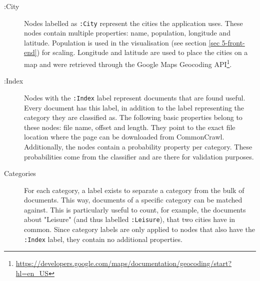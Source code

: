 \begin{description}
\item[:City] Nodes labelled as \texttt{:City} represent the cities the application uses. These nodes contain multiple properties: name, population, longitude and latitude. Population is used in the visualisation (see section \ref{sec 5-front-end}) for scaling. Longitude and latitude are used to place the cities on a map and were retrieved through the Google Maps Geocoding API\footnote{\url{https://developers.google.com/maps/documentation/geocoding/start?hl=en_US}}.
\item[:Index] Nodes with the \texttt{:Index} label represent documents that are found useful. Every document has this label, in addition to the label representing the category they are classified as. The following basic properties belong to these nodes: file name, offset and length. They point to the exact file location where the page can be downloaded from CommonCrawl. Additionally, the nodes contain a probability property per category. These probabilities come from the classifier and are there for validation purposes.
\item[Categories] For each category, a label exists to separate a category from the bulk of documents. This way, documents of a specific category can be matched against. This is particularly useful to count, for example, the documents about "Leisure" (and thus labelled \texttt{:Leisure}), that two cities have in common. Since category labels are only applied to nodes that also have the \texttt{:Index} label, they contain no additional properties.
\end{description}


